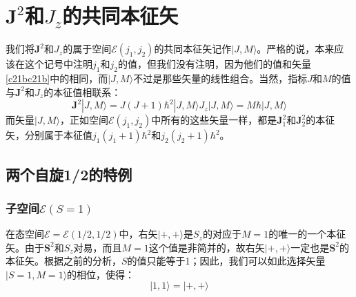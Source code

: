 \documentclass[]{article}
\begin{document}
\section{$\boldsymbol{J}^2$和$J_z$的共同本征矢}
我们将$\boldsymbol{J}^2$和$J_z$的属于空间$\mathscr{E}(j_1,j_2)$的共同本征矢记作$|J,M\rangle$。严格的说，本来应该在这个记号中注明$j_1$和$j_2$的值，但我们没有注明，因为他们的值和矢量\eqref{c21bc21b}中的相同，而$|J,M\rangle$不过是那些矢量的线性组合。当然，指标$J$和$M$的值与$\boldsymbol{J}^2$和$J_z$的本征值相联系：
\begin{subequations}
	\begin{equation}
		\boldsymbol{J}^2|J,M\rangle=J(J+1)\hbar^2|J,M\rangle
	\end{equation}
	\begin{equation}
		J_z|J,M\rangle=M\hbar|J,M\rangle 
	\end{equation}
\end{subequations}
而矢量$|J,M\rangle$，正如空间$\mathscr{E}(j_1,j_2)$中所有的这些矢量一样，都是$\boldsymbol{J}^2_1$和$\boldsymbol{J}^2_2$的本征矢，分别属于本征值$j_1(j_1+1)\hbar^2$和$j_2(j_2+1)\hbar^2$。
\subsection{两个自旋1/2的特例}
\subsubsection{子空间$\mathscr{E}(S=1)$}
在态空间$\mathscr{E}=\mathscr{E}(1/2,1/2)$中，右矢$|+,+\rangle$是$S_z$的对应于$M=1$的唯一的一个本征矢。由于$\boldsymbol{S}^2$和$S_z$对易，而且$M=1$这个值是非简并的，故右矢$|+,+\rangle$一定也是$\boldsymbol{S}^2$的本征矢。根据之前的分析，$S$的值只能等于1；因此，我们可以如此选择矢量$|S=1,M=1\rangle$的相位，使得：
\begin{equation}
	|1,1\rangle=|+,+\rangle
	\label{c43c43}
\end{equation}
\end{document}
